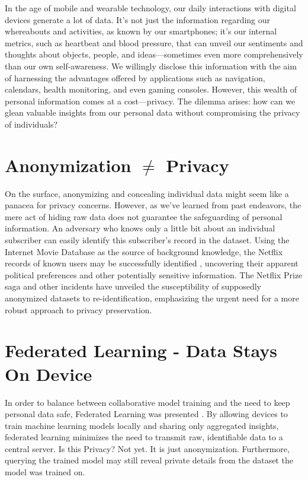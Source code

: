 \documentclass[fourier]{_style/dissertation}
\begin{document}
In the age of mobile and wearable technology, our daily interactions with digital devices generate a lot of data. It's not just the information regarding our whereabouts and activities, as known by our smartphones; it's our internal metrics, such as heartbeat and blood pressure, that can unveil our sentiments and thoughts about objects, people, and ideas—sometimes even more comprehensively than our own self-awareness.  We willingly disclose this information with the aim of harnessing the advantages offered by applications such as navigation, calendars, health monitoring, and even gaming consoles. However, this wealth of personal information comes at a cost—privacy. The dilemma arises: how can we glean valuable insights from our personal data without compromising the privacy of individuals?

\section{Anonymization $\neq$ Privacy }

On the surface, anonymizing and concealing individual data might seem like a panacea for privacy concerns. However, as we've learned from past endeavors, the mere act of hiding raw data does not guarantee the safeguarding of personal information. An  adversary  who  knows  only  a little  bit  about  an  individual  subscriber  can  easily identify  this subscriber’s record in the dataset. Using  the  Internet  Movie  Database as the  source of background knowledge, the Netflix records of known users may be successfully identified , uncovering their apparent political preferences and other potentially sensitive information. The Netflix Prize saga and other incidents have unveiled the susceptibility of supposedly anonymized datasets to re-identification, emphasizing the urgent need for a more robust approach to privacy preservation.

\section{Federated Learning - Data Stays On Device}

In order to balance between collaborative model training and the need to keep personal data safe, Federated Learning was presented . By allowing devices to train machine learning models locally and sharing only aggregated insights, federated learning minimizes the need to transmit raw, identifiable data to a central server. 
Is this Privacy? Not yet. It is just anonymization. Furthermore, querying the trained model may still reveal private details from the dataset the model was trained on.
\end{document}

